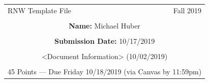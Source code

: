 \documentclass[12pt,letterpaper,final]{article}
\begin{document}


\begin{table}\centering
\begin{tabular*}{6.15in}{@{\extracolsep{\fill}}|llr|} \hline
RNW Template File & \hspace*{0.5 in} & Fall 2019 \\
 & & \\
\multicolumn{3}{|c|}{
{\bf Name:} Michael Huber} \\
 & & \\
\multicolumn{3}{|c|}{
{\bf Submission Date:} 10/17/2019} \\
 & & \\
\multicolumn{3}{|c|}{
<Document Information> (10/02/2019)} \\
 & & \\
\multicolumn{3}{|c|}{
45 Points --- Due Friday 10/18/2019 (via Canvas by 11:59pm)} \\
\hline
\end{tabular*}
\end{table}


~ \newpage
\end{document}
